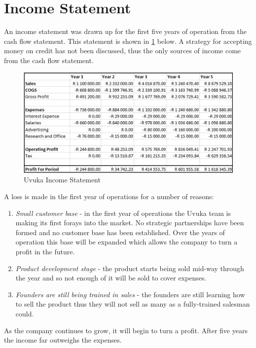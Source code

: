 \section{Income Statement}
An income statement was drawn up for the first five years of operation from the cash flow statement. This statement is shown in \cref{fig:IncomeStatement} below. A strategy for accepting money on credit has not been discussed, thus the only sources of income come from the cash flow statement. 

  \begin{figure}[H]
    \centering
    \includegraphics[width=1\textwidth]{images/IncomeStatement}
    \vskip10pt
    \caption[Uvuka Income Statement]{Uvuka Income Statement}
    \label{fig:IncomeStatement}
  \end{figure}

A loss is made in the first year of operations for a number of reasons:
  \begin{enumerate}
        \item \textit{Small customer base} - in the first year of operations the Uvuka team is making its first forays into the market. No strategic partnerships have been formed and no customer base has been established. Over the years of operation this base will be expanded which allows the company to turn a profit in the future.
        \item \textit{Product development stage} - the product starts being sold mid-way through the year and so not enough of it will be sold to cover expenses.
        \item \textit{Founders are still being trained in sales} - the founders are still learning how to sell the product thus they will not sell as many as a fully-trained salesman could.
        \end{enumerate}
        
As the company continues to grow, it will begin to turn a profit. After five years the income far outweighs the expenses.

